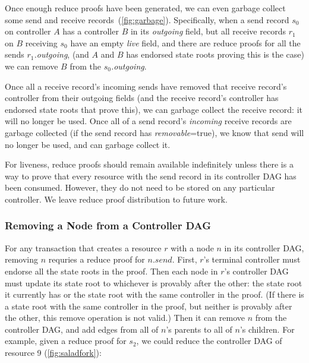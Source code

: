 \documentclass[a4paper,USenglish,cleveref, autoref, thm-restate, anonymous]{lipics-v2021}
\begin{document}
Once enough reduce proofs have been generated, we can even garbage collect some send and receive records~(\cref{fig:garbage}). 
Specifically, when a send record $s_0$ on controller $A$ has a controller $B$ in its \emph{outgoing} field, but all receive records $r_1$ on $B$ receiving $s_0$ have an empty \emph{live} field, and there are reduce proofs for all the sends \emph{$r_1$.outgoing}, (and $A$ and $B$ has endorsed state roots proving this is the case) we can remove $B$ from the $s_0$\emph{.outgoing}. 

Once all a receive record's incoming sends have removed that receive record's controller from their outgoing fields (and the receive record's controller has endorsed state roots that prove this), we can garbage collect the receive record: it will no longer be used. 
Once all of a send record's \emph{incoming} receive records are garbage collected (if the send record has \emph{removable}=true), we know that send will no longer be used, and can garbage collect it.

For liveness, reduce proofs should remain available indefinitely unless there is a way to prove that every resource with the send record in its controller DAG has been consumed. 
However, they do not need to be stored on any particular controller. 
We leave reduce proof distribution to future work. 

\subsubsection{Removing a Node from a Controller DAG}
For any transaction that creates a resource $r$ with a node $n$ in its controller DAG, removing $n$ requries a reduce proof for $n.send$.
First, $r$'s terminal controller must endorse all the state roots in the proof.
Then each node in $r$'s controller DAG must update its state root to whichever is provably after the other: the state root it currently has or the state root with the same controller in the proof. 
(If there is a state root with the same controller in the proof, but neither is provably after the other, this remove operation is not valid.)
Then it can remove $n$ from the controller DAG, and add edges from all of $n$'s parents to all of $n$'s children. 
For example, given a reduce proof for $s_2$, we could reduce the controller DAG of resource 9 (\cref{fig:saladfork}):
\end{document}
